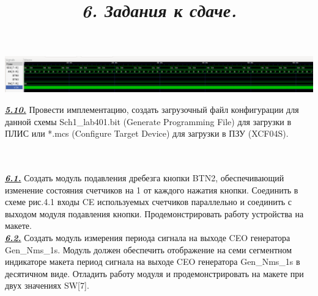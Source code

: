 \documentclass[a4paper]{article}
\begin{document}
\begin{center}
	\includegraphics[scale=0.3]{../images/my_counter.png}
\end{center}

\textbf{\textit{\underline{5.10.}}} Провести имплементацию, создать загрузочный файл конфигурации для данной схемы Sch1\_lab401.bit (Generate Programming File) для загрузки в ПЛИС или *.mcs (Configure Target Device) для загрузки в ПЗУ (XCF04S).\\

\title{\large{\textit{6. Задания к сдаче.}}} \\\\

\textbf{\textit{\underline{6.1.}}} Создать модуль подавления дребезга кнопки BTN2, обеспечивающий изменение состояния счетчиков на 1 от каждого нажатия кнопки. Соединить в схеме рис.4.1 входы CE используемых счетчиков параллельно и соединить с выходом модуля подавления кнопки. Продемонстрировать работу устройства на макете.\\

\textbf{\textit{\underline{6.2.}}} Создать модуль измерения периода сигнала на выходе CEO генератора Gen\_Nms\_1s. Модуль должен обеспечить отображение на семи сегментном индикаторе макета период сигнала на выходе CEO генератора Gen\_Nms\_1s в десятичном виде. Отладить работу модуля и продемонстрировать на макете при двух значениях SW[7].
\end{document}

